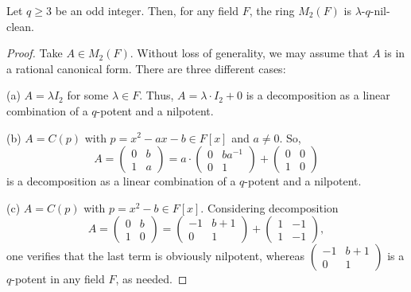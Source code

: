 \documentclass[10pt,a4paper]{amsart}
\begin{document}
\begin{proposition}\label{lambda-odd-N-M2}
Let $q \geq 3$ be an odd integer. Then, for any field $F$, the ring $M_{2}(F)$ is $\lambda$-$q$-nil-clean.
\end{proposition}

\begin{proof}
Take $A \in M_{2}(F)$. Without loss of generality, we may assume that $A$ is in a rational canonical form. There are three different cases:

\medskip

(a) $A = \lambda I_{2}$ for some $\lambda \in F$. Thus, $A = \lambda \cdot I_{2} + 0$ is a decomposition as a linear combination of a $q$-potent and a nilpotent.

\medskip

(b) $A = C(p)$ with $p = x^{2} - ax - b \in F[x]$ and $a \not = 0$. So,
\[
  A =
  \left(
  \begin{array}{cc}
  0 & b
  \\
  1 & a
  \end{array}
  \right)
  =
  a \cdot
  \left(
  \begin{array}{cc}
  0 & ba^{-1}
  \\
  0 & 1
  \end{array}
  \right)
  +
  \left(
  \begin{array}{cc}
  0 & 0
  \\
  1 & 0
  \end{array}
  \right)
\]
is a decomposition as a linear combination of a $q$-potent and a nilpotent.

\medskip

(c) $A = C(p)$ with $p = x^{2} - b \in F[x]$. Considering decomposition
\[
  A =
  \left(
  \begin{array}{cc}
  0 & b
  \\
  1 & 0
  \end{array}
  \right)
  =
  \left(
  \begin{array}{cc}
  -1 & b+1
  \\
  0 & 1
  \end{array}
  \right)
  +
  \left(
  \begin{array}{cc}
  1 & -1
  \\
  1 & -1
  \end{array}
  \right),
\]
one verifies that the last term is obviously nilpotent, whereas
$
\begin{pmatrix}
  -1 & b+1
  \\
  0 & 1
\end{pmatrix}
$
is a $q$-potent in any field $F$, as needed.
\end{proof}
\end{document}
